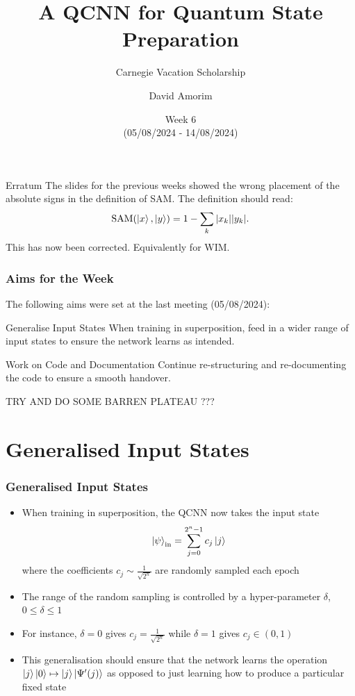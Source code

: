 \documentclass{beamer}
\title[QCNN State Preparation]{A QCNN for Quantum State Preparation}
\subtitle{Carnegie Vacation Scholarship}
\author[David Amorim]{David Amorim}
\institute[]{}
\date[14/08/2024]{Week 6 \\(05/08/2024 - 14/08/2024)}
\begin{document}
\frame{\titlepage}

\begin{frame}
\begin{exampleblock}{Erratum}
The slides for the previous weeks showed the wrong placement of the absolute signs in the definition of SAM. The definition should read:
\begin{equation}
\text{SAM}(\ket{x}, \ket{y}) = 1 - \sum_k |x_k| | y_k |.  
\end{equation}
This has now been corrected. Equivalently for WIM. 
\end{exampleblock}
\end{frame}

\begin{frame}
\frametitle{Aims for the Week}
The following aims were set at the last meeting (05/08/2024):

\begin{alertblock}{Generalise Input States}
When training in superposition, feed in a wider range of input states to ensure the network learns as intended. 
\end{alertblock}

\begin{alertblock}{Work on Code and Documentation}
Continue re-structuring and re-documenting the code to ensure a smooth handover. 
\end{alertblock}

TRY AND DO SOME BARREN PLATEAU ???

\end{frame}

\section{Generalised Input States}

\begin{frame}
\frametitle{Generalised Input States}

\begin{itemize}
\item When training in superposition, the QCNN now takes the input state 
\begin{equation}
\ket{\psi}_\text{{in}} =\sum^{2^n-1}_{j=0} c_j \ket{j} 
\end{equation}
where the \alert{coefficients} $c_j \sim \frac{1}{\sqrt{2^n}}$ are \alert{randomly sampled} each epoch
\item The \alert{range} of the random sampling is controlled by a \alert{hyper-parameter $\delta$},  $0 \leq \delta \leq 1$ 
\item For instance,  $\delta=0$ gives $c_j = \frac{1}{\sqrt{2^n}}$ while $\delta =1$ gives $c_j \in (0,1)$
\item This generalisation should ensure that the network learns the operation $\ket{j} \ket{0} \mapsto \ket{j} \ket{\Psi'(j)}$ as opposed to just learning how to produce a particular fixed state
\end{itemize}
\end{frame}
\end{document}
